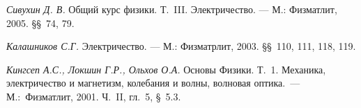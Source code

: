 \begin{lab:literature}

	\item \emph{Сивухин Д. В.} Общий курс физики. Т.~III. Электричество. --- М.: Физматлит, 2005. \S\S~74, 79.

	\item \emph{Калашников С.Г.} Электричество. --- М.: Физматрлит, 2003. \S\S~110, 111, 118, 119.

	\item \emph{Кингсеп А.С., Локшин Г.Р., Ольхов О.А.} Основы Физики. Т.~1. Механика, электричество и магнетизм, колебания и
	волны, волновая оптика.~--- М.:~Физматлит, 2001. Ч.~II, гл.~5, \S~5.3.

\end{lab:literature}
